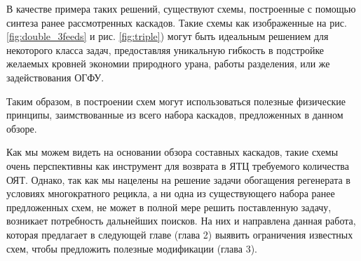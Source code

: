В качестве примера таких решений, существуют схемы, построенные с помощью синтеза ранее рассмотренных каскадов.
Такие схемы как изображенные на рис. \ref{fig:double_3feeds} и рис. \ref{fig:triple}) могут быть идеальным решением для некоторого класса задач, предоставляя уникальную гибкость в подстройке желаемых кровней экономии природного урана, работы разделения, или же задействования ОГФУ.

Таким образом, в построении схем могут использоваться полезные физические принципы, заимствованные из всего набора каскадов, предложенных в данном обзоре.

Как мы можем видеть на основании обзора составных каскадов, такие схемы очень перспективны как инструмент для возврата в ЯТЦ требуемого количества ОЯТ. Однако, 
так как мы нацелены на решение задачи обогащения регенерата в условиях многократного рецикла, а ни одна из существующего набора ранее предложенных схем, не может в полной мере решить поставленную задачу, возникает потребность дальнейших поисков. На них и направлена данная работа, которая предлагает в следующей главе (глава 2) выявить ограничения известных схем, чтобы предложить полезные модификации (глава 3).

